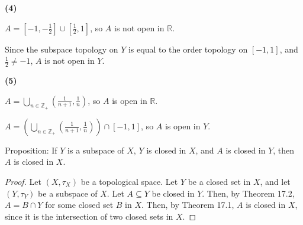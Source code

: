 \documentclass{article}
\newcommand{\Z}{\mathbb Z}
\newcommand{\R}{\mathbb R}
\begin{document}
\medskip
{\bf (4)}

    $A = \left[-1, -\frac12\right] \cup \left[\frac12, 1\right]$, so $A$ is not open in $\R$.

    Since the subspace topology on $Y$ is equal to the order topology on $[-1,1]$, and $\frac12 \neq -1$, $A$ is not open in $Y$.

\medskip
{\bf (5)}

    $A = \bigcup\limits_{n \in \Z_+} \left(\frac{1}{n+1}, \frac{1}{n}\right)$, so $A$ is open in $\R$.

    $A = \left(\bigcup\limits_{n \in \Z_+} \left(\frac{1}{n+1}, \frac{1}{n}\right)\right) \cap [-1,1]$, so $A$ is open in $Y$.

\newpage
{} Proposition: If $Y$ is a subspace of $X$, $Y$ is closed in $X$, and $A$ is closed in $Y$, then $A$ is closed in $X$.
\begin{proof}
    Let $(X, \tau_X)$ be a topological space.
    Let $Y$ be a closed set in $X$, and let $(Y, \tau_Y)$ be a subspace of $X$.
    Let $A \subseteq Y$ be closed in $Y$.
    Then, by Theorem 17.2, $A = B \cap Y$ for some closed set $B$ in $X$.
    Then, by Theorem 17.1, $A$ is closed in $X$, since it is the intersection of two closed sets in $X$.
\end{proof}
\end{document}
